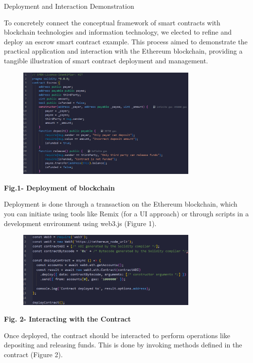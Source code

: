 Deployment and Interaction Demonstration

To concretely connect the conceptual framework of smart contracts with
blockchain technologies and information technology, we elected to refine
and deploy an escrow smart contract example. This process aimed to
demonstrate the practical application and interaction with the Ethereum
blockchain, providing a tangible illustration of smart contract
deployment and management.

\begin{figure}[H]
	\centering
	\includegraphics[width=0.8\textwidth]{assets/78}
	\caption*{}
\end{figure}

{\bfseries Fig.1- Deployment of blockchain}

Deployment is done through a transaction on the Ethereum blockchain,
which you can initiate using tools like Remix (for a UI approach) or
through scripts in a development environment using web3.js (Figure 1).

\begin{figure}[H]
	\centering
	\includegraphics[width=0.8\textwidth]{assets/79}
	\caption*{}
\end{figure}

{\bfseries Fig. 2- Interacting with the Contract}

Once deployed, the contract should be interacted to perform operations
like depositing and releasing funds. This is done by invoking methods
defined in the contract (Figure 2).

